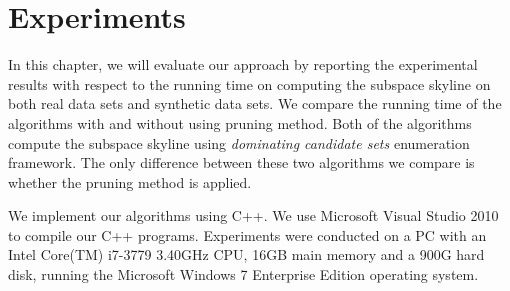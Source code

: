 
%
%

\chapter{Experiments}
\label{ch:exp}

In this chapter, we will evaluate our approach by reporting the experimental results with respect to the running time on computing the subspace skyline on both real data sets and synthetic data sets. We compare the running time of the algorithms with and without using pruning method. Both of the algorithms compute the subspace skyline using \emph{dominating candidate sets} enumeration framework. The only difference between these two algorithms we compare is whether the pruning method is applied.

We implement our algorithms using C++. We use Microsoft Visual Studio 2010 to compile our C++ programs. Experiments were conducted on a PC with an Intel Core(TM) i7-3779 3.40GHz CPU, 16GB main memory and a 900G hard disk, running the Microsoft Windows 7 Enterprise Edition operating system.

